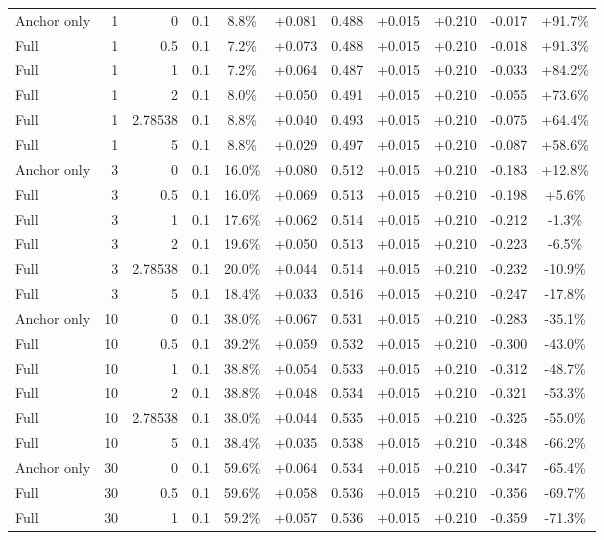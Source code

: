 \begin{table}[htbp]
\begin{tabular}{lrrrccccccc}
Anchor only & 1 & 0 & 0.1 & 8.8\% & +0.081 & 0.488 & +0.015 & +0.210 & -0.017 & +91.7\% \\
Full & 1 & 0.5 & 0.1 & 7.2\% & +0.073 & 0.488 & +0.015 & +0.210 & -0.018 & +91.3\% \\
Full & 1 & 1 & 0.1 & 7.2\% & +0.064 & 0.487 & +0.015 & +0.210 & -0.033 & +84.2\% \\
Full & 1 & 2 & 0.1 & 8.0\% & +0.050 & 0.491 & +0.015 & +0.210 & -0.055 & +73.6\% \\
Full & 1 & 2.78538 & 0.1 & 8.8\% & +0.040 & 0.493 & +0.015 & +0.210 & -0.075 & +64.4\% \\
Full & 1 & 5 & 0.1 & 8.8\% & +0.029 & 0.497 & +0.015 & +0.210 & -0.087 & +58.6\% \\
Anchor only & 3 & 0 & 0.1 & 16.0\% & +0.080 & 0.512 & +0.015 & +0.210 & -0.183 & +12.8\% \\
Full & 3 & 0.5 & 0.1 & 16.0\% & +0.069 & 0.513 & +0.015 & +0.210 & -0.198 & +5.6\% \\
Full & 3 & 1 & 0.1 & 17.6\% & +0.062 & 0.514 & +0.015 & +0.210 & -0.212 & -1.3\% \\
Full & 3 & 2 & 0.1 & 19.6\% & +0.050 & 0.513 & +0.015 & +0.210 & -0.223 & -6.5\% \\
Full & 3 & 2.78538 & 0.1 & 20.0\% & +0.044 & 0.514 & +0.015 & +0.210 & -0.232 & -10.9\% \\
Full & 3 & 5 & 0.1 & 18.4\% & +0.033 & 0.516 & +0.015 & +0.210 & -0.247 & -17.8\% \\
Anchor only & 10 & 0 & 0.1 & 38.0\% & +0.067 & 0.531 & +0.015 & +0.210 & -0.283 & -35.1\% \\
Full & 10 & 0.5 & 0.1 & 39.2\% & +0.059 & 0.532 & +0.015 & +0.210 & -0.300 & -43.0\% \\
Full & 10 & 1 & 0.1 & 38.8\% & +0.054 & 0.533 & +0.015 & +0.210 & -0.312 & -48.7\% \\
Full & 10 & 2 & 0.1 & 38.8\% & +0.048 & 0.534 & +0.015 & +0.210 & -0.321 & -53.3\% \\
Full & 10 & 2.78538 & 0.1 & 38.0\% & +0.044 & 0.535 & +0.015 & +0.210 & -0.325 & -55.0\% \\
Full & 10 & 5 & 0.1 & 38.4\% & +0.035 & 0.538 & +0.015 & +0.210 & -0.348 & -66.2\% \\
Anchor only & 30 & 0 & 0.1 & 59.6\% & +0.064 & 0.534 & +0.015 & +0.210 & -0.347 & -65.4\% \\
Full & 30 & 0.5 & 0.1 & 59.6\% & +0.058 & 0.536 & +0.015 & +0.210 & -0.356 & -69.7\% \\
Full & 30 & 1 & 0.1 & 59.2\% & +0.057 & 0.536 & +0.015 & +0.210 & -0.359 & -71.3\% \\

\end{tabular}
\end{table}
